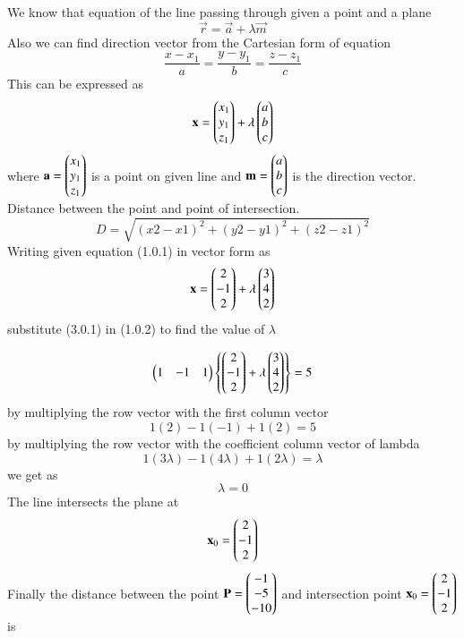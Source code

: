 
We know that equation of the line passing through given a point and a plane
\begin{equation}\label{eq:solutions/line_plane/107/eq2}
	\vec{r} = \vec{a}+\lambda\vec{m}
\end{equation}
Also we can find direction vector from the Cartesian form of equation
\begin{equation}
	\frac{x-x_1}{a} = \frac{y-y_1}{b} = \frac{z-z_1}{c}
\end{equation}
This can be expressed as
\begin{equation}
	\mathbf{x} = \begin{pmatrix}x_1\\y_1\\z_1\end{pmatrix} + \lambda\begin{pmatrix}a\\b\\c\end{pmatrix}
\end{equation}
where $\mathbf{a} = \begin{pmatrix}x_1\\y_1\\z_1\end{pmatrix}$ is a point on given line and $\mathbf{m} = \begin{pmatrix}a\\b\\c\end{pmatrix}$ is the direction vector.
\\
Distance between the point and point of intersection.
\begin{equation}
	D = \sqrt{(x2-x1)^2 + (y2-y1)^2 + (z2-z1)^2}
\end{equation}
Writing given equation (1.0.1) in vector form as
\begin{equation}
	\mathbf{x} = \begin{pmatrix}2\\-1\\2\end{pmatrix} + \lambda\begin{pmatrix}3\\4\\2\end{pmatrix}
\end{equation}
substitute (3.0.1) in (1.0.2)
to find the value of $\lambda$

\begin{equation}
	\begin{pmatrix}1 & -1 & 1\end{pmatrix}\left\{\begin{pmatrix}2 \\ -1 \\2\end{pmatrix} + \lambda \begin{pmatrix}3\\4\\2\end{pmatrix}\right\} = 5	
	\end{equation}
by multiplying the row vector with the first column vector 
\begin{equation}
 1(2) -1(-1) + 1(2) = 5
\end{equation}
by multiplying the row vector with the coefficient column vector of lambda 
\begin{equation}
 1(3\lambda) -1(4\lambda) +1(2\lambda) = \lambda
\end{equation}
we get as
\begin{equation}
\lambda = 0
\end{equation}
The line intersects the plane at
\begin{equation}
 \mathbf{x}_0 = \begin{pmatrix}2\\-1\\2\end{pmatrix}
\end{equation}
Finally the distance between the point 
$\mathbf{P} = \begin{pmatrix}-1\\-5\\-10\end{pmatrix}$ and intersection point $\mathbf{x}_0 = \begin{pmatrix}2\\-1\\2\end{pmatrix}$ is

